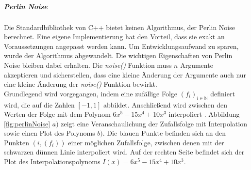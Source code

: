 \documentclass[11pt,a4paper]{article}
\begin{document}
\subparagraph{Perlin Noise}
Die Standardbibliothek von C++ bietet keinen Algorithmus, der Perlin Noise berechnet. Eine eigene Implementierung hat den Vorteil, dass sie exakt an Voraussetzungen angepasst werden kann. Um Entwicklungsaufwand zu sparen, wurde der Algorithmus abgewandelt. Die wichtigen Eigenschaften von Perlin Noise bleiben dabei erhalten. Die \textit{noise()} Funktion muss $n$ Argumente akzeptieren und sicherstellen, dass eine kleine Änderung der Argumente auch nur eine kleine Änderung der \textit{noise()} Funktion bewirkt.\\
Grundlegend wird vorgegangen, indem eine zufällige Folge $\left(f_i\right)_{i \in \mathbb{N}}$ definiert wird, die auf die Zahlen $[-1, 1]$ abbildet.
Anschließend wird zwischen den Werten der Folge mit dem Polynom $6x^5-15x^4+10x^3$ interpoliert \cite[S. 2]{bcc7190da8e90284b4e790817b8eed4ee3ea6cffbe5a23ef07a000ca5628ffbc}. Abbildung \ref{fig:perlinNoise} $a)$ zeigt eine Veranschaulichung der Zufallsfolge mit Interpolation sowie einen Plot des Polynoms $b)$. Die blauen Punkte befinden sich an den Punkten $\left(i, \left(f_i\right)\right)$ einer möglichen Zufallsfolge, zwischen denen mit der schwarzen dünnen Linie interpoliert wird. Auf der rechten Seite befindet sich der Plot des Interpolationspolynoms $I(x) = 6x^5-15x^4+10x^3$.
\end{document}
